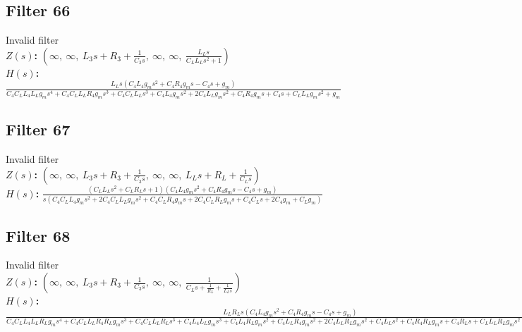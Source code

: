 \documentclass{article}
\begin{document}
\subsection*{Filter 66}
Invalid filter \\ 
\textbf{$Z(s)$:} $\left( \infty, \  \infty, \  L_{3} s + R_{3} + \frac{1}{C_{3} s}, \  \infty, \  \infty, \  \frac{L_{L} s}{C_{L} L_{L} s^{2} + 1}\right)$ \\ 
\textbf{$H(s)$:} $\frac{L_{L} s \left(C_{4} L_{4} g_{m} s^{2} + C_{4} R_{4} g_{m} s - C_{4} s + g_{m}\right)}{C_{4} C_{L} L_{4} L_{L} g_{m} s^{4} + C_{4} C_{L} L_{L} R_{4} g_{m} s^{3} + C_{4} C_{L} L_{L} s^{3} + C_{4} L_{4} g_{m} s^{2} + 2 C_{4} L_{L} g_{m} s^{2} + C_{4} R_{4} g_{m} s + C_{4} s + C_{L} L_{L} g_{m} s^{2} + g_{m}}$ \\ 
\subsection*{Filter 67}
Invalid filter \\ 
\textbf{$Z(s)$:} $\left( \infty, \  \infty, \  L_{3} s + R_{3} + \frac{1}{C_{3} s}, \  \infty, \  \infty, \  L_{L} s + R_{L} + \frac{1}{C_{L} s}\right)$ \\ 
\textbf{$H(s)$:} $\frac{\left(C_{L} L_{L} s^{2} + C_{L} R_{L} s + 1\right) \left(C_{4} L_{4} g_{m} s^{2} + C_{4} R_{4} g_{m} s - C_{4} s + g_{m}\right)}{s \left(C_{4} C_{L} L_{4} g_{m} s^{2} + 2 C_{4} C_{L} L_{L} g_{m} s^{2} + C_{4} C_{L} R_{4} g_{m} s + 2 C_{4} C_{L} R_{L} g_{m} s + C_{4} C_{L} s + 2 C_{4} g_{m} + C_{L} g_{m}\right)}$ \\ 
\subsection*{Filter 68}
Invalid filter \\ 
\textbf{$Z(s)$:} $\left( \infty, \  \infty, \  L_{3} s + R_{3} + \frac{1}{C_{3} s}, \  \infty, \  \infty, \  \frac{1}{C_{L} s + \frac{1}{R_{L}} + \frac{1}{L_{L} s}}\right)$ \\ 
\textbf{$H(s)$:} $\frac{L_{L} R_{L} s \left(C_{4} L_{4} g_{m} s^{2} + C_{4} R_{4} g_{m} s - C_{4} s + g_{m}\right)}{C_{4} C_{L} L_{4} L_{L} R_{L} g_{m} s^{4} + C_{4} C_{L} L_{L} R_{4} R_{L} g_{m} s^{3} + C_{4} C_{L} L_{L} R_{L} s^{3} + C_{4} L_{4} L_{L} g_{m} s^{3} + C_{4} L_{4} R_{L} g_{m} s^{2} + C_{4} L_{L} R_{4} g_{m} s^{2} + 2 C_{4} L_{L} R_{L} g_{m} s^{2} + C_{4} L_{L} s^{2} + C_{4} R_{4} R_{L} g_{m} s + C_{4} R_{L} s + C_{L} L_{L} R_{L} g_{m} s^{2} + L_{L} g_{m} s + R_{L} g_{m}}$ \\ 
\end{document}
